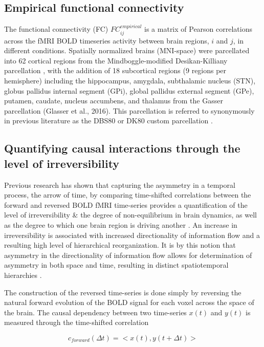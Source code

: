 \subsection{Empirical functional connectivity}
The functional connectivity (FC)
$FC_{ij}^{empirical}$ is a matrix of Pearson correlations across the
fMRI BOLD timeseries activity between brain regions, \(i\) and \(j\), in
different conditions. Spatially normalized brains (MNI-space) were
parcellated into 62 cortical regions from the Mindboggle-modified
Desikan-Killiany parcellation \parencite{Desikan2006}, with the addition
of 18 subcortical regions (9 regions per hemisphere) including the
hippocampus, amygdala, subthalamic nucleus (STN), globus pallidus
internal segment (GPi), global pallidus external segment (GPe), putamen,
caudate, nucleus accumbens, and thalamus from the Gasser parcellation
(Glasser et al., 2016). This parcellation is referred to synonymously in
previous literature as the DBS80 or DK80 custom parcellation \parencite{Capouskova2022,Deco2021,Desikan2006,Gomes2020,Klein2012,Kringelbach2023}.

\subsection{Quantifying causal interactions through the level of
irreversibility} 

Previous research has shown that capturing the asymmetry
in a temporal process, the arrow of time, by comparing time-shifted
correlations between the forward and reversed BOLD fMRI time-series
provides a quantification of the level of irreversibility \& the degree
of non-equilibrium in brain dynamics, as well as the degree to which one
brain region is driving another \parencite{Deco2022,Kringelbach2023}. An increase in irreversibility is associated with increased
directionality of information flow and a resulting high level of
hierarchical reorganization. It is by this
notion that asymmetry in the directionality of information flow allows
for determination of asymmetry in both space and time, resulting in
distinct spatiotemporal hierarchies \parencite{Deco2019,Golesorkhi2021,Kobeleva2021}.

The construction of the reversed time-series is done simply by reversing
the natural forward evolution of the BOLD signal for each voxel across
the space of the brain. The causal dependency between two time-series
\(x(t)\) and \(y(t)\) is measured through the time-shifted correlation

\begin{equation}
c_{forward}(\Delta t) = <x(t),y(t+\Delta t)>
\end{equation}
 
